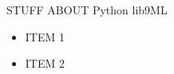\begin{multicols}{3}

STUFF ABOUT Python lib9ML

\begin{itemize}[nolistsep,topsep=0em,leftmargin=1pc]
\item ITEM 1
\item ITEM 2
\end{itemize}

\end{multicols}


